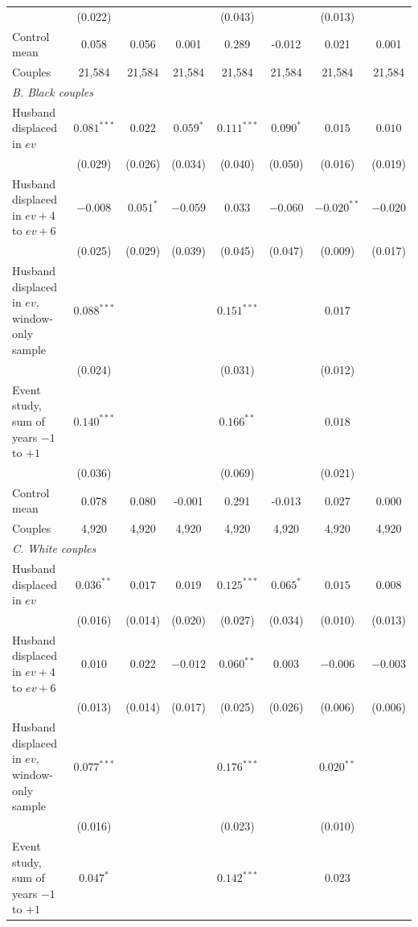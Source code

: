 \begin{table}[htbp]
{\begin{tabular}{lccccccc}
 & (0.022) &  &  & (0.043) &  & (0.013) &  \\
Control mean & 0.058 & 0.056 & 0.001 & 0.289 & -0.012 & 0.021 & 0.001 \\
Couples & 21,584 & 21,584 & 21,584 & 21,584 & 21,584 & 21,584 & 21,584 \\
\multicolumn{8}{l}{\textit{B. Black couples}} \\
Husband displaced in $ev$ & $0.081^{***}$ & $0.022$ & $0.059^{*}$ & $0.111^{***}$ & $0.090^{*}$ & $0.015$ & $0.010$ \\
 & (0.029) & (0.026) & (0.034) & (0.040) & (0.050) & (0.016) & (0.019) \\
Husband displaced in $ev+4$ to $ev+6$ & $-0.008$ & $0.051^{*}$ & $-0.059$ & $0.033$ & $-0.060$ & $-0.020^{**}$ & $-0.020$ \\
 & (0.025) & (0.029) & (0.039) & (0.045) & (0.047) & (0.009) & (0.017) \\
Husband displaced in $ev$, window-only sample & $0.088^{***}$ &  &  & $0.151^{***}$ &  & $0.017$ &  \\
 & (0.024) &  &  & (0.031) &  & (0.012) &  \\
Event study, sum of years $-1$ to $+1$ & $0.140^{***}$ &  &  & $0.166^{**}$ &  & $0.018$ &  \\
 & (0.036) &  &  & (0.069) &  & (0.021) &  \\
Control mean & 0.078 & 0.080 & -0.001 & 0.291 & -0.013 & 0.027 & 0.000 \\
Couples & 4,920 & 4,920 & 4,920 & 4,920 & 4,920 & 4,920 & 4,920 \\
\multicolumn{8}{l}{\textit{C. White couples}} \\
Husband displaced in $ev$ & $0.036^{**}$ & $0.017$ & $0.019$ & $0.125^{***}$ & $0.065^{*}$ & $0.015$ & $0.008$ \\
 & (0.016) & (0.014) & (0.020) & (0.027) & (0.034) & (0.010) & (0.013) \\
Husband displaced in $ev+4$ to $ev+6$ & $0.010$ & $0.022$ & $-0.012$ & $0.060^{**}$ & $0.003$ & $-0.006$ & $-0.003$ \\
 & (0.013) & (0.014) & (0.017) & (0.025) & (0.026) & (0.006) & (0.006) \\
Husband displaced in $ev$, window-only sample & $0.077^{***}$ &  &  & $0.176^{***}$ &  & $0.020^{**}$ &  \\
 & (0.016) &  &  & (0.023) &  & (0.010) &  \\
Event study, sum of years $-1$ to $+1$ & $0.047^{*}$ &  &  & $0.142^{***}$ &  & $0.023$ &  \\

\end{tabular}}
\end{table}
